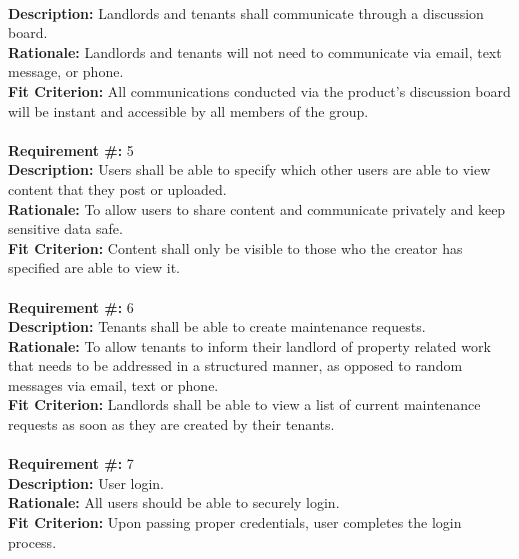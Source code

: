 \documentclass[12pt]{article}
\begin{document}
       \\
      \textbf{Description:} Landlords and tenants shall communicate through a discussion
    board. \\
      \textbf{Rationale:} Landlords and tenants will not need to communicate via email,
    text message, or phone. \\
      \textbf{Fit Criterion:} All communications conducted via the product's discussion
    board will be instant and accessible by all members of the group. \\ \\ 
\textbf{Requirement \#:} 5
       \\
      \textbf{Description:} Users shall be able to specify which other users
      are able to view content that they post or uploaded. \\
      \textbf{Rationale:} To allow users to share content and communicate
      privately and keep sensitive data safe. \\
      \textbf{Fit Criterion:} Content shall only be visible to those who the
      creator has specified are able to view it. \\ \\
\textbf{Requirement \#:} 6
       \\
      \textbf{Description:} Tenants shall be able to create maintenance
      requests. \\
      \textbf{Rationale:} To allow tenants to inform their landlord of property
      related work that needs to be addressed in a structured manner, as opposed to random messages via email, text or phone.\\
      \textbf{Fit Criterion:} Landlords shall be able to view a list of current
      maintenance requests as soon as they are created by their tenants.\\ \\          
\textbf{Requirement \#:} 7
       \\
      \textbf{Description: }{User login.} \\
      \textbf{Rationale: }{All users should be able to securely login.} \\
      \textbf{Fit Criterion: }{Upon passing proper credentials, user completes 
the login process.} \\ \\
\end{document}
